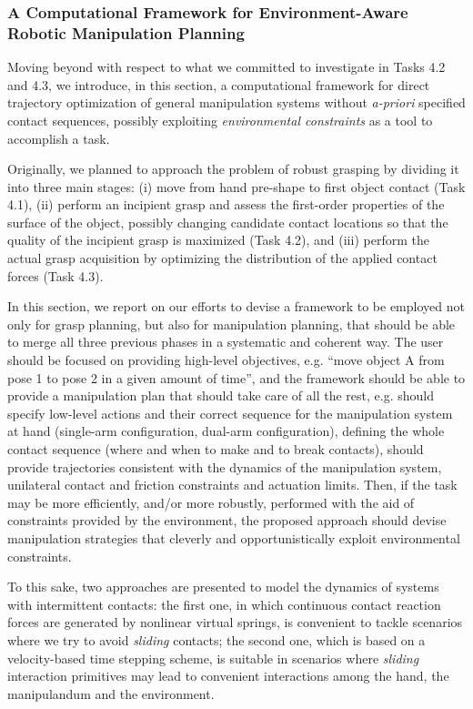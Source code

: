 
\subsubsection{A Computational Framework for Environment-Aware Robotic Manipulation Planning}
\label{sec:ComputationalFramework}


Moving beyond with respect to what we committed to investigate in Tasks 4.2 and 4.3, we introduce, in this section, a computational framework for direct trajectory optimization of general manipulation systems without \textsl{a-priori} specified contact sequences, possibly exploiting \emph{environmental constraints} as a tool to accomplish a task.

 Originally, we planned to approach the problem of robust grasping by dividing it into three main stages: (i) move from hand pre-shape to first object contact (Task 4.1), (ii) perform an incipient grasp and assess the first-order properties of the surface of the object, possibly changing candidate contact locations so that the quality of the incipient grasp is maximized (Task 4.2), and (iii) perform the actual grasp acquisition by optimizing the distribution of the applied contact forces (Task 4.3).

 In this section, we report on our efforts to devise a framework to be employed not only for grasp planning, but also for manipulation planning, that should be able to merge all three previous phases in a systematic and coherent way. The user should be focused on providing high-level objectives, e.g. ``move object A from pose 1 to pose 2 in a given amount of time'', and the framework should be able to provide a manipulation plan that should take care of all the rest, e.g. should specify low-level actions and their correct sequence for the manipulation system at hand (single-arm configuration, dual-arm configuration),  defining the whole contact sequence (where and when to make and to break contacts), should provide trajectories consistent with the dynamics of the manipulation system, unilateral contact and friction constraints and actuation limits. Then, if the task may be more efficiently, and/or more robustly, performed with the aid of constraints provided by the environment, the proposed approach should devise manipulation strategies that cleverly and opportunistically exploit environmental constraints.

 To this sake, two approaches are presented to model the dynamics of systems with intermittent contacts: the first one, in which continuous contact reaction forces are generated  by nonlinear virtual springs, is convenient to tackle scenarios where we try to avoid \emph{sliding} contacts; the second one, which is based on a velocity-based time stepping scheme, is suitable in scenarios where \emph{sliding} interaction primitives may lead to convenient interactions among the hand, the manipulandum and the environment.

